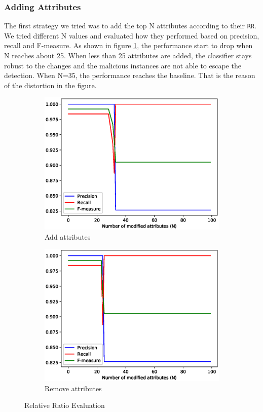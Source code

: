\documentclass[11pt]{article}
\begin{document}
\subsubsection{Adding Attributes}
The first strategy we tried was to add the top N attributes according to their \texttt{RR}. We tried different N values and evaluated how they performed based on precision, recall and F-measure. As shown in figure \ref{fig:add}, the performance start to drop when N reaches about 25. When less than 25 attributes are added, the classifier stays robust to the changes and the malicious instances are not able to escape the detection. When N=35, the performance reaches the baseline. That is the reason of the distortion in the figure.

\begin{figure}[htbp]
\centering

\begin{subfigure}[htbp]{0.48\columnwidth}
\includegraphics*[width=\textwidth]{fig/addattrPR}
\caption{Add attributes}
\label{fig:add}
\end{subfigure}
\hfill
\begin{subfigure}[htbp]{0.48\columnwidth}
\includegraphics*[width=\textwidth]{fig/subattrPR}
\caption{Remove attributes}
\label{fig:sub}
\end{subfigure}
\caption{Relative Ratio Evaluation}
\label{fig:RRevaluation}
\end{figure}
\end{document}
